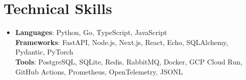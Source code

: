 \documentclass[letterpaper,11pt]{article}
\begin{document}
\section{Technical Skills}
\begin{itemize}[leftmargin=0.15in, label={}, topsep=0pt, itemsep=0pt, parsep=0pt, partopsep=0pt]
  \item{\fontsize{9.6pt}{10.0pt}\selectfont
   \textbf{Languages}{: Python, Go, TypeScript, JavaScript} \\
   \textbf{Frameworks}{: FastAPI, Node.js, Next.js, React, Echo, SQLAlchemy, Pydantic, PyTorch} \\
   \textbf{Tools}{: PostgreSQL, SQLite, Redis, RabbitMQ, Docker, GCP Cloud Run, GitHub Actions, Prometheus, OpenTelemetry, JSONL} \\
  }
\end{itemize}
\end{document}
